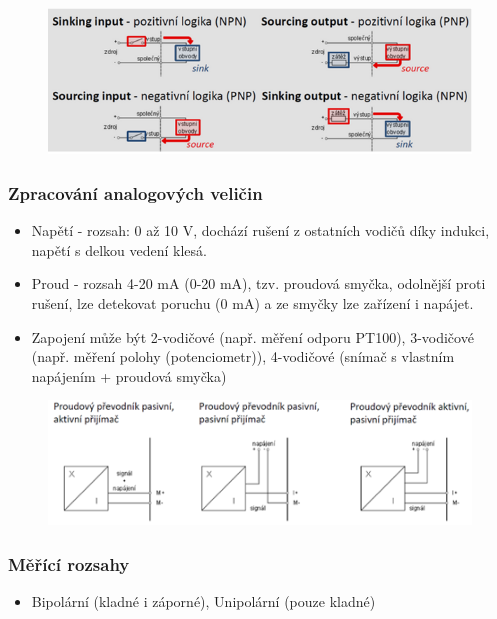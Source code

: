 \begin{figure}[h]
    \begin{center}
        \includegraphics[scale = 1]{img/picture5.png}
    \end{center}
\end{figure}

\subsubsection*{Zpracování analogových veličin}
\begin{itemize}
    \item Napětí - rozsah: 0 až 10 V, dochází rušení z ostatních vodičů díky indukci, napětí s delkou vedení klesá.
    \item Proud - rozsah 4-20 mA (0-20 mA), tzv. proudová smyčka, odolnější proti rušení, lze detekovat poruchu (0 mA) a ze smyčky lze zařízení i napájet.
    \item Zapojení může být 2-vodičové (např. měření odporu PT100), 3-vodičové (např. měření polohy (potenciometr)), 4-vodičové (snímač s vlastním napájením + proudová smyčka)
\end{itemize}

\begin{figure}[h]
    \begin{center}
        \includegraphics[scale = 1]{img/picture4.png}
    \end{center}
\end{figure}

\subsubsection*{Měřící rozsahy}
\begin{itemize}
    \item Bipolární (kladné i záporné), Unipolární (pouze kladné)
\end{itemize}

